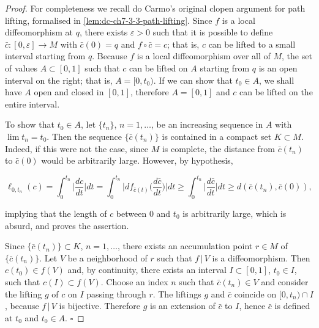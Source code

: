 \begin{proof}
  For completeness we recall do Carmo's original clopen argument for path lifting,
  formalised in \cref{lem:dc-ch7-3-3-path-lifting}. Since $f$ is a local
  diffeomorphism at $q$, there exists $\varepsilon>0$ such that
  it is possible to define $\bar c:[0,\varepsilon]\to M$ with $\bar c(0)=q$ and
  $f\circ\bar c=c$; that is, $c$ can be lifted to a small interval starting from $q$.
  Because $f$ is a local diffeomorphism over all of $M$, the set of values
  $A\subset[0,1]$ such that $c$ can be lifted on $A$ starting from $q$ is an open
  interval on the right; that is, $A=[0,t_0)$. If we can show that $t_0\in A$, we
  shall have $A$ open and closed in $[0,1]$, therefore $A=[0,1]$ and $c$ can be
  lifted on the entire interval.
  
  To show that $t_0\in A$, let $\{t_n\}$, $n=1,\dots$, be an increasing sequence in
  $A$ with $\lim t_n=t_0$. Then the sequence $\{\bar c(t_n)\}$ is contained in a
  compact set $K\subset M$. Indeed, if this were not the case, since $M$ is
  complete, the distance from $\bar c(t_n)$ to $\bar c(0)$ would be arbitrarily
  large. However, by hypothesis,
  
  $$
  \ell_{0,t_n}(c)=\int_0^{t_n}\Big|\frac{dc}{dt}\Big|dt=\int_0^{t_n}\Big|df_{\bar c(t)}\Big(\frac{d\bar c}{dt}\Big)\Big|dt\ge\int_0^{t_n}\Big|\frac{d\bar c}{dt}\Big|dt\ge d(\bar c(t_n),\bar c(0)),
  $$
  
  implying that the length of $c$ between $0$ and $t_0$ is arbitrarily large, which
  is absurd, and proves the assertion.
  
  Since $\{\bar c(t_n)\}\subset K$, $n=1,\dots$, there exists an accumulation point
  $r\in M$ of $\{\bar c(t_n)\}$. Let $V$ be a neighborhood of $r$ such that $f\,|\,V$
  is a diffeomorphism. Then $c(t_0)\in f(V)$ and, by continuity, there exists an
  interval $I\subset[0,1]$, $t_0\in I$, such that $c(I)\subset f(V)$. Choose an
  index $n$ such that $\bar c(t_n)\in V$ and consider the lifting $g$ of $c$ on $I$
  passing through $r$. The liftings $g$ and $\bar c$ coincide on $[0,t_n)\cap I$,
  because $f\,|\,V$ is bijective. Therefore $g$ is an extension of $\bar c$ to $I$,
  hence $\bar c$ is defined at $t_0$ and $t_0\in A$. $\square$
\end{proof}

